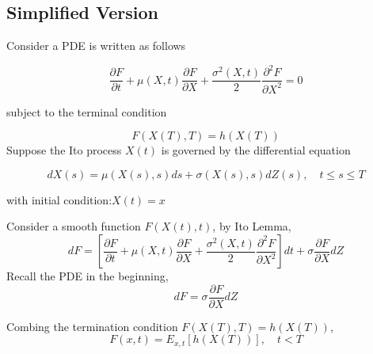 \documentclass[a4]{article}
\begin{document}
\subsection{Simplified Version}
Consider a PDE is written as follows\par 
$$
\frac{\partial F}{\partial t}+\mu(X, t) \frac{\partial F}{\partial X}+\frac{\sigma^{2}(X, t)}{2} \frac{\partial^{2} F}{\partial X^{2}}=0
$$\par
subject to the terminal condition\par 
$$F(X(T), T)=h(X(T))$$
\bigbreak
\noindent Suppose the Ito process $X(t)$ is governed by the differential equation \par 
$$
d X(s)=\mu(X(s), s) d s+\sigma(X(s), s) d Z(s), \quad t \leq s \leq T
$$\par 
with initial condition:$ X(t)=x$\par 
\bigbreak
\noindent Consider a smooth function $F(X(t), t)$, by Ito Lemma,
$$
d F=\left[\frac{\partial F}{\partial t}+\mu(X, t) \frac{\partial F}{\partial X}+\frac{\sigma^{2}(X, t)}{2} \frac{\partial^{2} F}{\partial X^{2}}\right] d t+\sigma \frac{\partial F}{\partial X} d Z
$$
Recall the PDE in the beginning, 
$$
d F=\sigma \frac{\partial F}{\partial X} d Z
$$\par 
Combing the termination condition $F(X(T), T)=h(X(T))$,
$$
F(x, t)=E_{x, t}[h(X(T))], \quad t<T
$$
\end{document}
